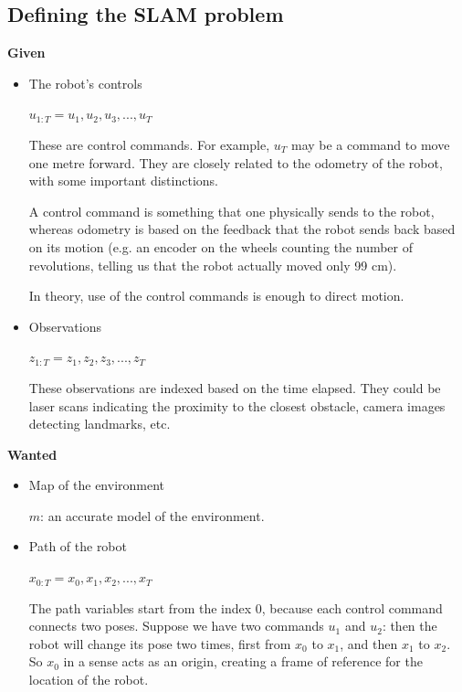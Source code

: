 \documentclass[a4paper]{article}
\begin{document}
\subsection{Defining the SLAM problem}

\textbf{Given}

\begin{itemize}

    \item The robot's controls
    
    $u_{1:T} = {u_1, u_2, u_3,...,u_T}$
    
    These are control commands. For example, $u_T$ may be a command to move one metre forward. They are closely related to the odometry of the robot, with some important distinctions.
    
    A control command is something that one physically sends to the robot, whereas odometry is based on the feedback that the robot sends back based on its motion (e.g. an encoder on the wheels counting the number of revolutions, telling us that the robot actually moved only 99 cm).
    
    In theory, use of the control commands is enough to direct motion.
    
    \item Observations
    
    $z_{1:T} = {z_1, z_2, z_3,...,z_T}$
    
    These observations are indexed based on the time elapsed. They could be laser scans indicating the proximity to the closest obstacle, camera images detecting landmarks, etc.
    
\end{itemize}

\textbf{Wanted}

\begin{itemize}

    \item Map of the environment
    
    $m$: an accurate model of the environment.
    
    \item Path of the robot
    
    $x_{0:T} = {x_0, x_1, x_2,...,x_T}$
    
    The path variables start from the index 0, because each control command connects two poses. Suppose we have two commands $u_1$ and $u_2$: then the robot will change its pose two times, first from $x_0$ to $x_1$, and then $x_1$ to $x_2$. So $x_0$ in a sense acts as an origin, creating a frame of reference for the location of the robot.
    
\end{itemize}
\end{document}
